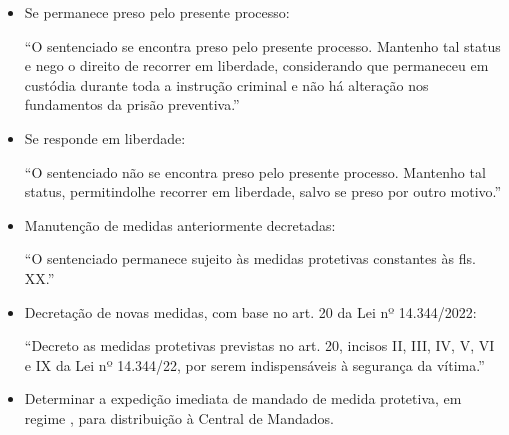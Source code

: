 \documentclass[letterpaper,10pt,brazil]{sphinxmanual}
\begin{document}
\sphinxAtStartPar
{}
\begin{itemize}
\item {} 
\sphinxAtStartPar
Se permanece preso pelo presente processo:

\begin{sphinxVerbatim}[commandchars=\\\{\}]
“O sentenciado se encontra preso pelo presente processo. Mantenho tal status e nego o direito de recorrer em liberdade, considerando que permaneceu em custódia durante toda a instrução criminal e não há alteração nos fundamentos da prisão preventiva.”
\end{sphinxVerbatim}

\item {} 
\sphinxAtStartPar
Se responde em liberdade:

\begin{sphinxVerbatim}[commandchars=\\\{\}]
“O sentenciado não se encontra preso pelo presente processo. Mantenho tal status, permitindo\PYGZhy{}lhe recorrer em liberdade, salvo se preso por outro motivo.”
\end{sphinxVerbatim}

\end{itemize}

\sphinxAtStartPar
{}
\begin{itemize}
\item {} 
\sphinxAtStartPar
Manutenção de medidas anteriormente decretadas:

\begin{sphinxVerbatim}[commandchars=\\\{\}]
“O sentenciado permanece sujeito às medidas protetivas constantes às fls. XX.”
\end{sphinxVerbatim}

\item {} 
\sphinxAtStartPar
Decretação de novas medidas, com base no art. 20 da Lei nº 14.344/2022:

\begin{sphinxVerbatim}[commandchars=\\\{\}]
“Decreto as medidas protetivas previstas no art. 20, incisos II, III, IV, V, VI e IX da Lei nº 14.344/22, por serem indispensáveis à segurança da vítima.”
\end{sphinxVerbatim}

\item {} 
\sphinxAtStartPar
Determinar a expedição imediata de mandado de medida protetiva, em regime , para distribuição à Central de Mandados.

\end{itemize}
\end{document}
